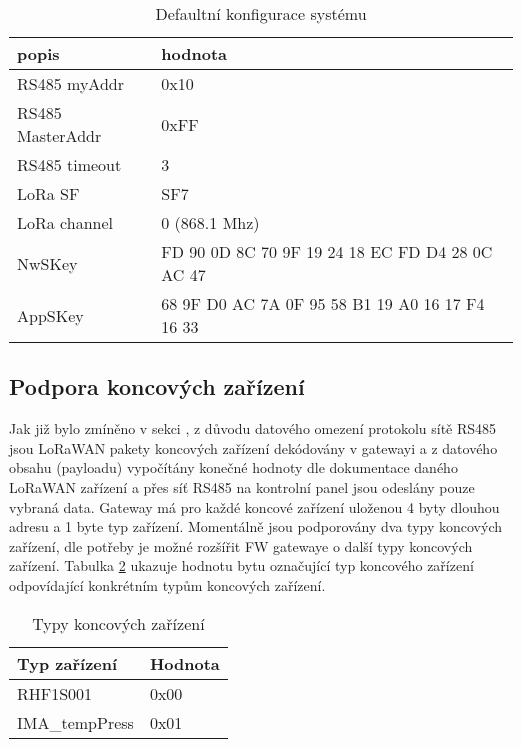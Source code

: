 \begin{table}[!h]
    \centering
    \begin{ctucolortab}
    \begin{tabular}{ |l|l| }
     \hline

     popis              & hodnota         \\ \hline \hline
     RS485 myAddr       & 0x10            \\ \hline
     RS485 MasterAddr   & 0xFF            \\ \hline
     RS485 timeout      & 3               \\ \hline
     LoRa SF            & SF7             \\ \hline
     LoRa channel       & 0 (868.1 Mhz)   \\ \hline
     NwSKey             & FD 90 0D 8C 70 9F 19 24 18 EC FD D4 28 0C AC 47  \\ \hline
     AppSKey            & 68 9F D0 AC 7A 0F 95 58 B1 19 A0 16 17 F4 16 33  \\ \hline

    \end{tabular}
\end{ctucolortab}
    \caption{Defaultní konfigurace systému}
    \label{table:5}
\end{table}


\newpage
\subsection{Podpora koncových zařízení}
Jak již bylo zmíněno v sekci \label{Implementace WSN do přístupového systému}, z důvodu datového omezení protokolu sítě RS485 jsou LoRaWAN pakety koncových zařízení dekódovány v gatewayi a z datového obsahu (payloadu) vypočítány konečné hodnoty dle dokumentace daného LoRaWAN zařízení a přes síť RS485 na kontrolní panel jsou odeslány pouze vybraná data. Gateway má pro každé koncové zařízení uloženou 4 byty dlouhou adresu a 1 byte typ zařízení.
Momentálně jsou podporovány dva typy koncových zařízení, dle potřeby je možné rozšířit FW gatewaye o další typy koncových zařízení. Tabulka \ref{table:TypyKoncZarizeni} ukazuje hodnotu bytu označující typ koncového zařízení odpovídající konkrétním typům koncových zařízení.

\begin{table}[!h]
    \centering
    \begin{ctucolortab}
    \begin{tabular}{ |l|l| }
     \hline

     Typ zařízení       & Hodnota         \\ \hline \hline
     RHF1S001           & 0x00            \\ \hline
     IMA\_tempPress     & 0x01            \\ \hline

    \end{tabular}
    \end{ctucolortab}
    \caption{Typy koncových zařízení}
    \label{table:TypyKoncZarizeni}
\end{table}

